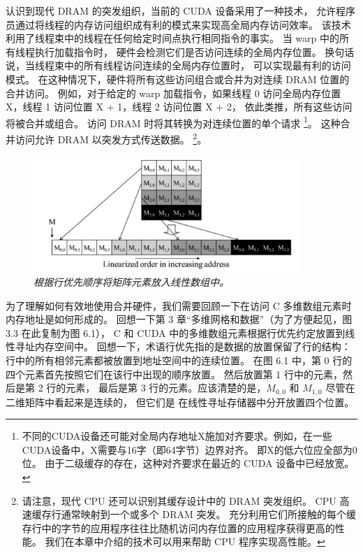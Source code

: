 认识到现代 DRAM 的突发组织，当前的 CUDA 设备采用了一种技术，
允许程序员通过将线程的内存访问组织成有利的模式来实现高全局内存访问效率。 
该技术利用了线程束中的线程在任何给定时间点执行相同指令的事实。 当 warp 中的所有线程执行加载指令时，
硬件会检测它们是否访问连续的全局内存位置。 换句话说，当线程束中的所有线程访问连续的全局内存位置时，
可以实现最有利的访问模式。 在这种情况下，硬件将所有这些访问组合或合并为对连续 DRAM 位置的合并访问。 
例如，对于给定的 warp 加载指令，如果线程 0 访问全局内存位置 X，线程 1 访问位置 X + 1，线程 2 访问位置 X + 2，
依此类推，所有这些访问将被合并或组合。 访问 DRAM 时将其转换为对连续位置的单个请求
\footnote{不同的CUDA设备还可能对全局内存地址X施加对齐要求。例如，在一些CUDA设备中，X需要与16字（即64字节）边界对齐。 
即X的低六位应全部为0位。 由于二级缓存的存在，这种对齐要求在最近的 CUDA 设备中已经放宽。}。
这种合并访问允许 DRAM 以突发方式传送数据。
\footnote{请注意，现代 CPU 还可以识别其缓存设计中的 DRAM 突发组织。 CPU 高速缓存行通常映射到一个或多个 DRAM 突发。 
充分利用它们所接触的每个缓存行中的字节的应用程序往往比随机访问内存位置的应用程序获得更高的性能。 
我们在本章中介绍的技术可以用来帮助 CPU 程序实现高性能。}。

\begin{figure}[H]
	\centering
	\includegraphics[width=0.9\textwidth]{figs/F6.1.png}
	\caption{\textit{根据行优先顺序将矩阵元素放入线性数组中。}}
\end{figure}

为了理解如何有效地使用合并硬件，我们需要回顾一下在访问 C 多维数组元素时内存地址是如何形成的。 
回想一下第 3 章“多维网格和数据”（为了方便起见，图 3.3 在此复制为图 6.1），
C 和 CUDA 中的多维数组元素根据行优先约定放置到线性寻址内存空间中。 
回想一下，术语行优先指的是数据的放置保留了行的结构：行中的所有相邻元素都被放置到地址空间中的连续位置。 
在图 6.1 中，第 0 行的四个元素首先按照它们在该行中出现的顺序放置。 然后放置第 1 行中的元素，然后是第 2 行的元素，
最后是第 3 行的元素。应该清楚的是，$M_{0,0}$ 和 $M_{1,0}$ 尽管在二维矩阵中看起来是连续的，
但它们是 在线性寻址存储器中分开放置四个位置。

